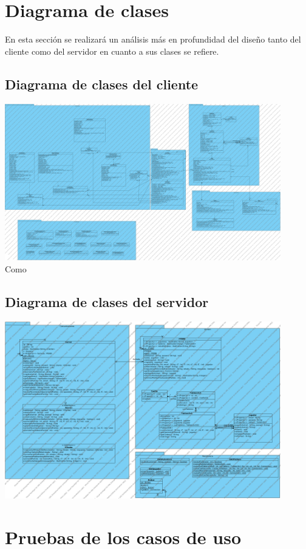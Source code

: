 \documentclass[a4paper,11pt,oneside]{article}
\begin{document}
\section{Diagrama de clases}

En esta sección se realizará un análisis más en profundidad del diseño tanto del cliente como del servidor en cuanto a sus clases se refiere.

\subsection{Diagrama de clases del cliente}

\includegraphics[width=0.9\textwidth]{img/ddc_Cliente.png}\\[1cm]

Como
\subsection{Diagrama de clases del servidor}

\includegraphics[width=0.9\textwidth]{img/ddc_Servidor.png}\\[1cm]

\section{Pruebas de los casos de uso}
\end{document}
